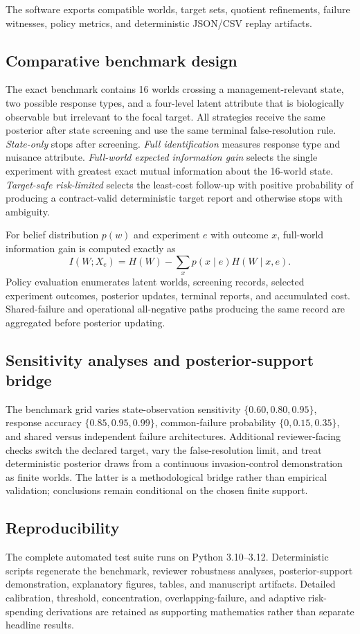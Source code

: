 \documentclass[11pt]{article}
\begin{document}
The software exports compatible worlds, target sets, quotient refinements, failure witnesses, policy metrics, and deterministic JSON/CSV replay artifacts.

\subsection{Comparative benchmark design}
The exact benchmark contains 16 worlds crossing a management-relevant state, two possible response types, and a four-level latent attribute that is biologically observable but irrelevant to the focal target. All strategies receive the same posterior after state screening and use the same terminal false-resolution rule. \emph{State-only} stops after screening. \emph{Full identification} measures response type and nuisance attribute. \emph{Full-world expected information gain} selects the single experiment with greatest exact mutual information about the 16-world state. \emph{Target-safe risk-limited} selects the least-cost follow-up with positive probability of producing a contract-valid deterministic target report and otherwise stops with ambiguity.

For belief distribution $p(w)$ and experiment $e$ with outcome $x$, full-world information gain is computed exactly as
\[
I(W;X_e)=H(W)-\sum_x p(x\mid e)H(W\mid x,e).
\]
Policy evaluation enumerates latent worlds, screening records, selected experiment outcomes, posterior updates, terminal reports, and accumulated cost. Shared-failure and operational all-negative paths producing the same record are aggregated before posterior updating.

\subsection{Sensitivity analyses and posterior-support bridge}
The benchmark grid varies state-observation sensitivity $\{0.60,0.80,0.95\}$, response accuracy $\{0.85,0.95,0.99\}$, common-failure probability $\{0,0.15,0.35\}$, and shared versus independent failure architectures. Additional reviewer-facing checks switch the declared target, vary the false-resolution limit, and treat deterministic posterior draws from a continuous invasion-control demonstration as finite worlds. The latter is a methodological bridge rather than empirical validation; conclusions remain conditional on the chosen finite support.

\subsection{Reproducibility}
The complete automated test suite runs on Python 3.10--3.12. Deterministic scripts regenerate the benchmark, reviewer robustness analyses, posterior-support demonstration, explanatory figures, tables, and manuscript artifacts. Detailed calibration, threshold, concentration, overlapping-failure, and adaptive risk-spending derivations are retained as supporting mathematics rather than separate headline results.
\end{document}
